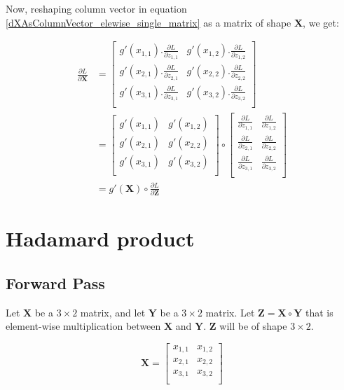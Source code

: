 \documentclass{article}
\newcommand{\matr}[1]{\mathbf{#1}} %
\begin{document}
Now, reshaping column vector in equation \ref{dXAsColumnVector_elewise_single_matrix} as a matrix of shape $\matr{X}$, we get:

\begin{align}
\frac{\partial L}{\partial \matr{X}} &=
\begin{bmatrix}
g'(x_{1,1}).\frac{\partial L}{\partial z_{1,1}} &
g'(x_{1,2}).\frac{\partial L}{\partial z_{1,2}} \\[0.7em]
g'(x_{2,1}).\frac{\partial L}{\partial z_{2,1}} &
g'(x_{2,2}).\frac{\partial L}{\partial z_{2,2}} \\[0.7em]
g'(x_{3,1}).\frac{\partial L}{\partial z_{3,1}} &
g'(x_{3,2}).\frac{\partial L}{\partial z_{3,2}} \\[0.7em]
\end{bmatrix}
\nonumber \\
&=
\begin{bmatrix}
g'(x_{1,1}) & g'(x_{1,2}) \\[0.5em]
g'(x_{2,1}) & g'(x_{2,2}) \\[0.5em]
g'(x_{3,1}) & g'(x_{3,2}) \\[0.5em]
\end{bmatrix}
\circ
\begin{bmatrix}
\frac{\partial L}{\partial z_{1,1}} & \frac{\partial L}{\partial z_{1,2}} \\[0.5em]
\frac{\partial L}{\partial z_{2,1}} & \frac{\partial L}{\partial z_{2,2}} \\[0.5em]
\frac{\partial L}{\partial z_{3,1}} & \frac{\partial L}{\partial z_{3,2}} \\[0.5em]
\end{bmatrix}
\nonumber \\
&=
g'(\matr{X}) \circ \frac{\partial L}{\partial \matr{Z}}
\end{align}

\section{Hadamard product}
\subsection{Forward Pass}
Let $\matr{X}$ be a $3 \times 2$ matrix, and let $\matr{Y}$ be a $3 \times 2$ matrix. Let $\matr{Z} = \matr{X} \circ \matr{Y}$ that is element-wise multiplication between $\matr{X}$ and $\matr{Y}$. $\matr{Z}$ will be of shape $3 \times 2$.

\begin{displaymath}
\matr{X} =
\begin{bmatrix}
x_{1,1} & x_{1,2} \\%
x_{2,1} & x_{2,2} \\%
x_{3,1} & x_{3,2} \\%
\end{bmatrix}
\end{displaymath}
\end{document}
